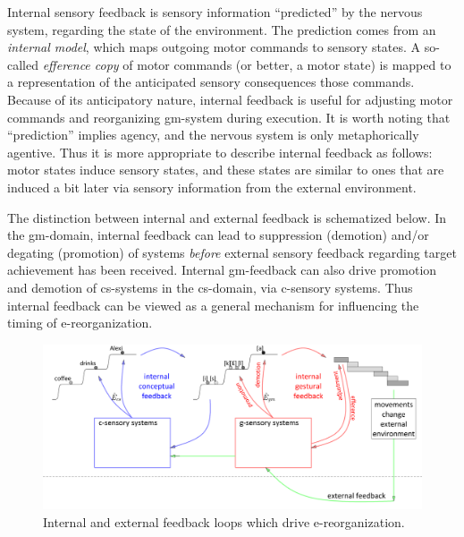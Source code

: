   Internal sensory feedback is sensory information “predicted” by the nervous system, regarding the state of the environment. The prediction comes from an \textit{internal model}, which maps outgoing motor commands to sensory states. A so-called \textit{efference copy} of motor commands (or better, a motor state) is mapped to a representation of the anticipated sensory consequences those commands. Because of its anticipatory nature, internal feedback is useful for adjusting motor commands and reorganizing gm-system during execution. It is worth noting that “prediction” implies agency, and the nervous system is only metaphorically agentive. Thus it is more appropriate to describe internal feedback as follows: motor states induce sensory states, and these states are similar to ones that are induced a bit later via sensory information from the external environment.

The distinction between internal and external feedback is schematized below. In the gm-domain, internal feedback can lead to suppression (demotion) and/or degating (promotion) of systems \textit{before} external sensory feedback regarding target achievement has been received. Internal gm-feedback can also drive promotion and demotion of cs-systems in the cs-domain, via c-sensory systems. Thus internal feedback can be viewed as a general mechanism for influencing the timing of e-reorganization.

  
\begin{figure}
\includegraphics[width=\textwidth]{figures/Tilsen-img57.png}
\caption{Internal and external feedback loops which drive e-reorganization.}
\label{fig:4:7}
\end{figure}
       

